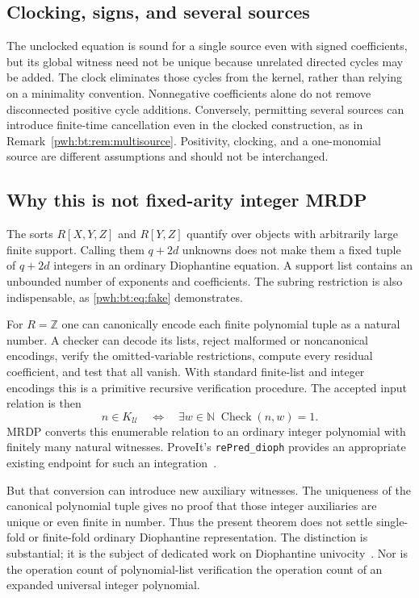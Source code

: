 \documentclass[11pt,letterpaper]{article}
\numberwithin{equation}{section}
\theoremstyle{definition}
\newcommand{\N}{\mathbb N}
\newcommand{\Z}{\mathbb Z}
\begin{document}
\subsection{Clocking, signs, and several sources}
The unclocked equation is sound for a single source even with signed
coefficients, but its global witness need not be unique because
unrelated directed cycles may be added. The clock eliminates those
cycles from the kernel, rather than relying on a minimality convention.
Nonnegative coefficients alone do not remove disconnected positive
cycle additions. Conversely, permitting several sources can introduce
finite-time cancellation even in the clocked construction, as in
Remark~\ref{pwh:bt:rem:multisource}. Positivity, clocking, and a one-monomial
source are different assumptions and should not be interchanged.

\subsection{Why this is not fixed-arity integer MRDP}\label{pwh:bt:sec:mrdp}
The sorts $R[X,Y,Z]$ and $R[Y,Z]$ quantify over objects with arbitrarily
large finite support. Calling them $q+2d$ unknowns does not make them a
fixed tuple of $q+2d$ integers in an ordinary Diophantine equation. A
support list contains an unbounded number of exponents and coefficients.
The subring restriction is also indispensable, as
\eqref{pwh:bt:eq:fake} demonstrates.

For $R=\Z$ one can canonically encode each finite polynomial tuple as a
natural number. A checker can decode its lists, reject malformed or
noncanonical encodings, verify the omitted-variable restrictions,
compute every residual coefficient, and test that all vanish. With
standard finite-list and integer encodings this is a primitive
recursive verification procedure. The accepted input relation is then
\[
 n\in K_{\mathcal U}\quad\Longleftrightarrow\quad
 \exists w\in\N\;\operatorname{Check}(n,w)=1.
\]
MRDP converts this enumerable relation to an ordinary integer
polynomial with finitely many natural witnesses. ProveIt's
\texttt{rePred\_dioph} provides an appropriate existing endpoint for
such an integration~\cite{bt:repo-bridge}.

But that conversion can introduce new auxiliary witnesses. The
uniqueness of the canonical polynomial tuple gives no proof that those
integer auxiliaries are unique or even finite in number. Thus the
present theorem does not settle single-fold or finite-fold ordinary
Diophantine representation. The distinction is substantial; it is the
subject of dedicated work on Diophantine univocity~\cite{bt:matiyasevich2010,bt:cantone2024}.
Nor is the operation count of polynomial-list verification the
operation count of an expanded universal integer polynomial.
\end{document}
